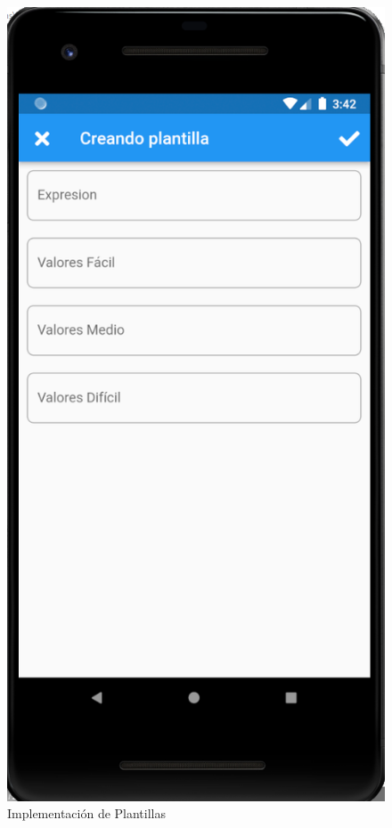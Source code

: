 \documentclass{article}
\begin{document}
\begin{figure}[H]
    \centering
    \includegraphics[scale=0.8]{imgs/Imp/Plantillas2}
    \caption{Implementación de Plantillas}
\end{figure}
\end{document}
